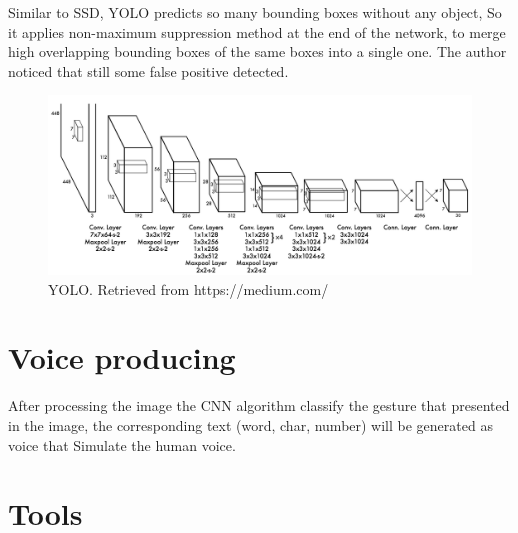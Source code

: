 \documentclass[12pt]{report}
\begin{document}
Similar to SSD, YOLO predicts so many bounding boxes without any object,
So it applies non-maximum suppression method at the end of the network,
to merge high overlapping bounding boxes of the same boxes into a single one.
The author noticed that still some false positive detected.\cite{Redmon2016}


\bigbreak
\bigbreak
\bigbreak

\clearpage
\begin{figure}[h]
    \centering
    \includegraphics[width=1\textwidth]{./images/yolo.png}
    \caption{YOLO. Retrieved from https://medium.com/}
    \label{fig:frcnn}
\end{figure} 

\bigbreak
\bigbreak

\section{Voice producing}

After processing the image the CNN algorithm classify the gesture
that presented in the image, the corresponding text (word, char, number)
will be generated as voice that Simulate the human voice. 

\section{Tools}
\end{document}
